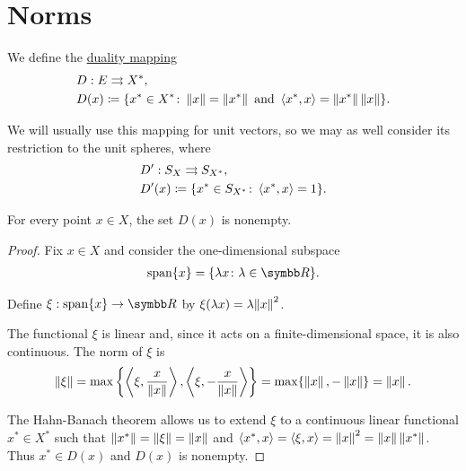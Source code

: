 \section{Norms}\label{sec:norms}

\begin{definition}\cite[Example 2.26]{Phelps1993}
  We define the \ul{duality mapping}
  \begin{align*}
    &D: E \rightrightarrows X^*, \\
    &D(x) \coloneqq \{ x^* \in X^* \colon \left\Vert x \right\Vert = \left\Vert x^* \right\Vert \text{ and } \left\langle x^*, x \right\rangle = \left\Vert x^* \right\Vert \left\Vert x \right\Vert \}.
  \end{align*}
\end{definition}

\begin{note}
  We will usually use this mapping for unit vectors, so we may as well consider its restriction to the unit spheres, where
  \begin{align*}
    &D': S_X \rightrightarrows S_{X^*}, \\
    &D'(x) \coloneqq \{ x^* \in S_{X^*} \colon \left\langle x^*, x \right\rangle = 1 \}.
  \end{align*}
\end{note}

\begin{lemma}\label{thm:nonempty_banach_duality_mapping}
  For every point $x \in X$, the set $D(x)$ is nonempty.
\end{lemma}
\begin{proof}
  Fix $x \in X$ and consider the one-dimensional subspace
  \begin{align*}
    \Span \{ x \}
    =
    \{ \lambda x \colon \lambda \in \BB{R} \}.
  \end{align*}

  Define $\xi: \Span \{ x \} \to \BB{R}$ by $\xi(\lambda x) = \lambda {\left\Vert x \right\Vert}^2$.

  The functional $\xi$ is linear and, since it acts on a finite-dimensional space, it is also continuous. The norm of $\xi$ is
  \begin{align*}
    \left\Vert \xi \right\Vert = \max \left\{ \left\langle \xi, \frac x {\left\Vert x \right\Vert} \right\rangle, \left\langle \xi, -\frac x {\left\Vert x \right\Vert} \right\rangle \right\} = \max \{ \left\Vert x \right\Vert, -\left\Vert x \right\Vert \} = \left\Vert x \right\Vert.
  \end{align*}

  The Hahn-Banach theorem allows us to extend $\xi$ to a continuous linear functional $x^* \in X^*$ such that $\left\Vert x^* \right\Vert = \left\Vert \xi \right\Vert = \left\Vert x \right\Vert$ and $\left\langle x^*, x \right\rangle = \left\langle \xi, x \right\rangle = \left\Vert x \right\Vert^2 = \left\Vert x \right\Vert \left\Vert x^* \right\Vert$. Thus $x^* \in D(x)$ and $D(x)$ is nonempty.
\end{proof}

